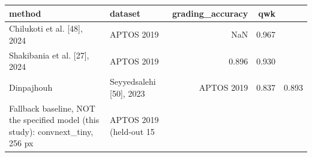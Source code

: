 \begin{tabular}{llrr}
\toprule
method & dataset & grading_accuracy & qwk \\
\midrule
Chilukoti et al. [48], 2024 & APTOS 2019 & NaN & 0.967 \\
Shakibania et al. [27], 2024 & APTOS 2019 & 0.896 & 0.930 \\
Dinpajhouh & Seyyedsalehi [50], 2023 & APTOS 2019 & 0.837 & 0.893 \\
Fallback baseline, NOT the specified model (this study): convnext_tiny, 256 px & APTOS 2019 (held-out 15%
\bottomrule
\end{tabular}
